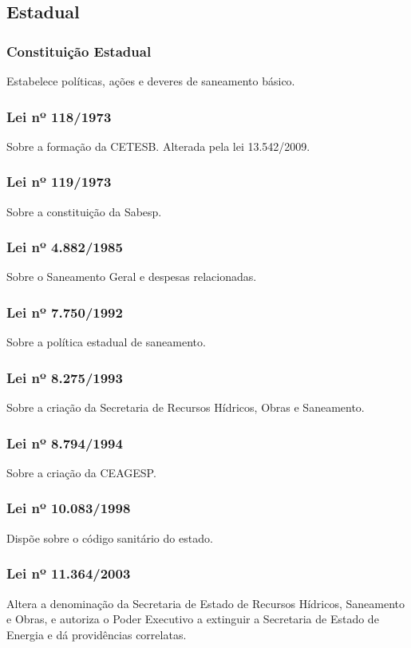 \begin{subapend}
	\subsection{Estadual}
	\begin{subsubapend}
		\item \subsubsection{Constituição Estadual}
		Estabelece políticas, ações e deveres de saneamento básico.
		\subsubsection{Lei nº 118/1973}
		Sobre a formação da CETESB. Alterada pela lei 13.542/2009.
		\subsubsection{Lei nº 119/1973}
		Sobre a constituição da Sabesp.
		\subsubsection{Lei nº 4.882/1985}
		Sobre o Saneamento Geral e despesas relacionadas.
		\subsubsection{Lei nº 7.750/1992}
		Sobre a política estadual de saneamento.
		\subsubsection{Lei nº 8.275/1993}
		Sobre a criação da Secretaria de Recursos Hídricos, Obras e Saneamento.
		\subsubsection{Lei nº 8.794/1994}
		Sobre a criação da CEAGESP.
		\subsubsection{Lei nº 10.083/1998}
		Dispõe sobre o código sanitário do estado.
		\subsubsection{Lei nº 11.364/2003}
		Altera a denominação da Secretaria de Estado de Recursos Hídricos, Saneamento e Obras, e autoriza o Poder Executivo a extinguir a Secretaria de Estado de Energia e dá providências correlatas.

\end{subsubapend}
\end{subapend}
